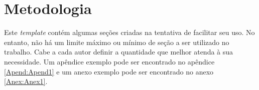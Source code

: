 \chapter{Metodologia}

Este \textit{template} contém algumas seções criadas na tentativa de facilitar seu uso. No entanto, não há um limite máximo ou mínimo de seção a ser utilizado no trabalho. Cabe a cada autor definir a quantidade que melhor atenda à sua necessidade.
Um apêndice exemplo pode ser encontrado no apêndice \ref{Apend:Apend1} e um anexo exemplo pode ser encontrado no anexo \ref{Anex:Anex1}. 
